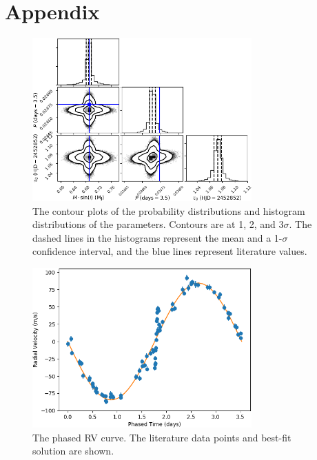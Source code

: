 \documentclass[12pt]{article}
\begin{document}



\section*{Appendix}
\vspace{-1em}
\begin{figure}[H]
\centering
\includegraphics[width=0.75\textwidth]{contours.png}
\vspace{-0.5em}
\caption{The contour plots of the probability distributions and histogram distributions of the parameters. Contours are at 1, 2, and 3$\sigma$. The dashed lines in the histograms represent the mean and a 1-$\sigma$ confidence interval, and the blue lines represent literature values.}
\end{figure}

\vspace{-1em}
\begin{figure}[H]
\centering
\includegraphics[width=0.75\textwidth]{phasedrv.png}
\vspace{-0.5em}
\caption{The phased RV curve. The literature data points and best-fit solution are shown.}
\end{figure}
\end{document}
